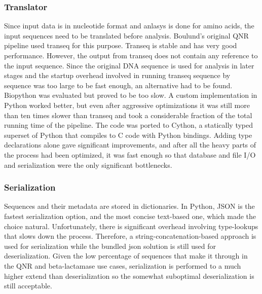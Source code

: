 \documentclass[a4paper,12pt]{article}
\begin{document}
\subsubsection{Translator}
Since input data is in nucleotide format and anlasys is done for amino acids, the input sequences need to be translated before analysis. Boulund's original QNR pipeline used transeq for this purpose. Transeq is stable and has very good performance. However, the output from transeq does not contain any reference to the input sequence. Since the original DNA sequence is used for analysis in later stages and the startup overhead involved in running transeq sequence by sequence was too large to be fast enough, an alternative had to be found. Biopython was evaluated but proved to be too slow. A custom implementation in Python worked better, but even after aggressive optimizations it was still more than ten times slower than transeq and took a considerable fraction of the total running time of the pipeline. The code was ported to Cython, a statically typed superset of Python that compiles to C code with Python bindings. Adding type declarations alone gave significant improvements, and after all the heavy parts of the process had been optimized, it was fast enough so that database and file I/O and serialization were the only significant bottlenecks.

\subsubsection{Serialization}
Sequences and their metadata are stored in dictionaries. In Python, JSON is the fastest serialization option, and the most concise text-based one, which made the choice natural. Unfortunately, there is significant overhead involving type-lookups that slows down the process. Therefore, a string-concatenation-based approach is used for serialization while the bundled json solution is still used for deserialization. Given the low percentage of sequences that make it through in the QNR and beta-lactamase use cases, serialization is performed to a much higher extend than deserialization so the somewhat suboptimal deserialization is still acceptable.
\end{document}
